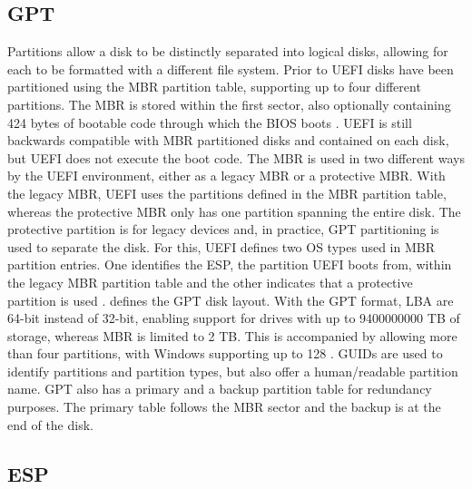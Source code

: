 \subsection{\acf{GPT}}

Partitions allow a disk to be distinctly separated into logical disks, allowing for each to be formatted with a different file system.
Prior to \ac{UEFI} disks have been partitioned using the \ac{MBR} partition table, supporting up to four different partitions.
The \ac{MBR} is stored within the first sector, also optionally containing 424 bytes of bootable code through which the \ac{BIOS} boots \cite[Section 13.3.1]{uefi-spec}.
\ac{UEFI} is still backwards compatible with \ac{MBR} partitioned disks and contained on each disk, but \ac{UEFI} does not execute the boot code.
The \ac{MBR} is used in two different ways by the \ac{UEFI} environment, either as a legacy \ac{MBR} or a protective \ac{MBR}.
With the legacy \ac{MBR}, \ac{UEFI} uses the partitions defined in the \ac{MBR} partition table, whereas the protective \ac{MBR} only has one partition spanning the entire disk.
The protective partition is for legacy devices and, in practice, \ac{GPT} partitioning is used to separate the disk.
For this, \ac{UEFI} defines two \ac{OS} types used in \ac{MBR} partition entries.
One identifies the \ac{ESP}, the partition \ac{UEFI} boots from, within the legacy \ac{MBR} partition table and the other indicates that a protective partition is used \cite[Section 5]{uefi-spec}.
\cite[Section 5]{uefi-spec} defines the \ac{GPT} disk layout. With the \ac{GPT} format, \ac{LBA} are 64-bit instead of 32-bit, enabling support for drives with up to 9400000000 \ac{TB} of storage, whereas \ac{MBR} is limited to 2 \ac{TB}.
This is accompanied by allowing more than four partitions, with Windows supporting up to 128 \cite{microsoft-windows-and-gpt-faq}.
\acp{GUID} are used to identify partitions and partition types, but also offer a human\-/readable partition name.
\ac{GPT} also has a primary and a backup partition table for redundancy purposes.
The primary table follows the \ac{MBR} sector and the backup is at the end of the disk.

\subsection{\acf{ESP}}

